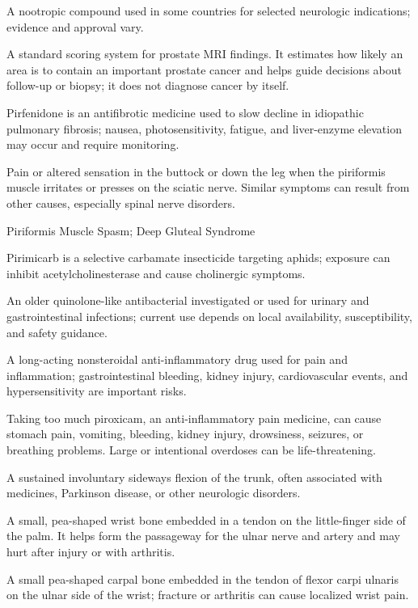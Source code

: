  A nootropic compound used in some countries for selected neurologic indications; evidence and approval vary.

 A standard scoring system for prostate MRI findings. It estimates how likely an area is to contain an important prostate cancer and helps guide decisions about follow-up or biopsy; it does not diagnose cancer by itself.

 Pirfenidone is an antifibrotic medicine used to slow decline in idiopathic pulmonary fibrosis; nausea, photosensitivity, fatigue, and liver-enzyme elevation may occur and require monitoring.

 Pain or altered sensation in the buttock or down the leg when the piriformis muscle irritates or presses on the sciatic nerve. Similar symptoms can result from other causes, especially spinal nerve disorders.

\synonyms
Piriformis Muscle Spasm; Deep Gluteal Syndrome

 Pirimicarb is a selective carbamate insecticide targeting aphids; exposure can inhibit acetylcholinesterase and cause cholinergic symptoms.

 An older quinolone-like antibacterial investigated or used for urinary and gastrointestinal infections; current use depends on local availability, susceptibility, and safety guidance.

 A long-acting nonsteroidal anti-inflammatory drug used for pain and inflammation; gastrointestinal bleeding, kidney injury, cardiovascular events, and hypersensitivity are important risks.

 Taking too much piroxicam, an anti-inflammatory pain medicine, can cause stomach pain, vomiting, bleeding, kidney injury, drowsiness, seizures, or breathing problems. Large or intentional overdoses can be life-threatening.

 A sustained involuntary sideways flexion of the trunk, often associated with medicines, Parkinson disease, or other neurologic disorders.

 A small, pea-shaped wrist bone embedded in a tendon on the little-finger side of the palm. It helps form the passageway for the ulnar nerve and artery and may hurt after injury or with arthritis.

 A small pea-shaped carpal bone embedded in the tendon of flexor carpi ulnaris on the ulnar side of the wrist; fracture or arthritis can cause localized wrist pain.

